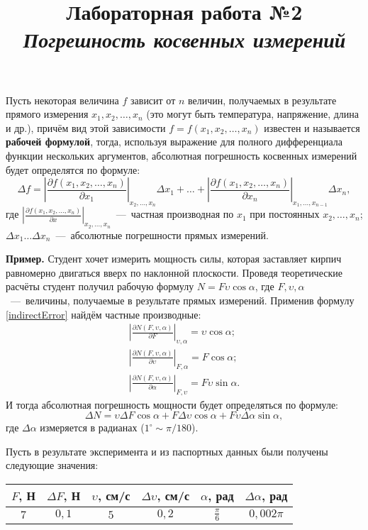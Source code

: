 \documentclass[14pt,a4paper]{article}
\title{Лабораторная работа №2 \\ \textit{Погрешность косвенных измерений}}
\begin{document}
\maketitle
Пусть некоторая величина $f$ зависит от $n$ величин, получаемых в результате прямого измерения  $x_1, x_2, \ldots, x_n$ (это могут быть температура, напряжение, длина и др.), причём вид этой зависимости $f = f(x_1, x_2, \ldots, x_n)$ известен и называется \textbf{рабочей формулой}, тогда, используя выражение для полного дифференциала функции нескольких аргументов, абсолютная погрешность косвенных измерений будет определятся по формуле:
\begin{equation} \label{indirectError}
    \Delta f = \left | \frac{\partial f(x_1, x_2, \ldots, x_n)}{\partial x_1} \right |_{x_2, \ldots, x_n} \Delta x_1 + \ldots + \left | \frac{\partial f(x_1, x_2, \ldots, x_n)}{\partial x_n} \right |_{x_1, \ldots, x_{n-1}} \Delta x_n,
\end{equation}
где $\left | \frac{\partial f(x_1, x_2, \ldots, x_n)}{\partial x} \right |_{x_2, \ldots, x_n}$~---~частная производная по $x_1$ при постоянных $x_2, \ldots, x_n$; $\Delta x_1 \ldots \Delta x_n$~---~абсолютные погрешности прямых измерений.

\textbf{Пример.}
Студент хочет измерить мощность силы, которая заставляет кирпич равномерно двигаться вверх по наклонной плоскости. Проведя теоретические расчёты студент получил рабочую формулу $N = F\upsilon\cos{\alpha}$, где $F, \upsilon, \alpha$~---~величины, получаемые в результате прямых измерений. Применив формулу \ref{indirectError} найдём частные производные:
\begin{gather*}
    \left | \frac{\partial N(F, \upsilon, \alpha)}{\partial F} \right |_{\upsilon, \alpha} = \upsilon\cos{\alpha} ; \\
    \left | \frac{\partial N(F, \upsilon, \alpha)}{\partial \upsilon} \right |_{F, \alpha} = F\cos{\alpha} ; \\
    \left | \frac{\partial N(F, \upsilon, \alpha)}{\partial \alpha} \right |_{F, \upsilon} = F\upsilon\sin{\alpha}.
\end{gather*}
И тогда абсолютная погрешность мощности будет определяться по формуле:
\begin{equation*}
    \Delta N = \upsilon\Delta F\cos{\alpha} + F\Delta \upsilon\cos{\alpha} + F\upsilon\Delta\alpha\sin{\alpha},
\end{equation*}
где $\Delta\alpha$ измеряется в радианах ($1^\circ \sim \pi/180$). 

Пусть в результате эксперимента и из паспортных данных были получены следующие значения:
\begin{tabular}{|c|c|c|c|c|c|}
    \hline
    $F$, Н & $\Delta F$, Н & $\upsilon$, см/с & $\Delta \upsilon$, см/с & $\alpha$, рад & $\Delta \alpha$, рад\\ \hline
    $7$ & $0,1$ & $5$ & $0,2$ & $\frac{\pi}{6}$ & $0,002\pi$ \\ \hline
\end{tabular}
\end{document}
